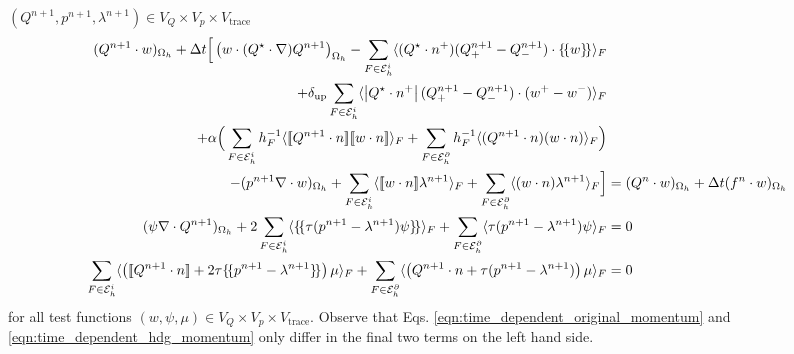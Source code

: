 \documentclass[11pt]{article}
\newcommand{\jump}[1]{[\![ #1]\!]}
\newcommand{\avg}[1]{\{\!\{#1\}\!\}}
\begin{document}
$(Q^{n+1},p^{n+1},\lambda^{n+1})\in V_Q\times V_p\times V_{\text{trace}}$
\begin{subequations}
    \begin{align}
        (Q^{n+1}\cdot w)_{\Omega_h} + \Delta t\Big[  \left(w\cdot (Q^\star\cdot \nabla) Q^{n+1}\right)_{\Omega_h}  -\sum_{F\in\mathcal{E}_h^i} \langle (Q^\star \cdot n^+)(Q^{n+1}_+ - Q^{n+1}_-)\cdot \avg{w}\rangle_F                              &
        \notag                                                                                                                                                                                                                                                                                                             \\
        +\delta_{\text{up}}\sum_{F\in\mathcal{E}_h^i} \langle \left|Q^\star \cdot n^+\right|(Q^{n+1}_+ - Q^{n+1}_-)\cdot (w^+-w^-)\rangle_F                                                                                                          & \label{eqn:time_dependent_hdg_momentum}                             \\
        + \alpha \Big(\sum_{F\in\mathcal{E}_h^i} h_F^{-1}\langle \jump{Q^{n+1}\cdot n} \jump{w\cdot n}\rangle_F                                      +  \sum_{F\in\mathcal{E}_h^\partial} h_F^{-1}\langle (Q^{n+1}\cdot n) (w\cdot n)\rangle_F \Big) & \notag                                                              \\
        - (p^{n+1} \nabla\cdot w)_{\Omega_h} +  \sum_{F\in\mathcal{E}_h^i} \langle \jump{w\cdot n}\lambda^{n+1}\rangle_{F}  +  \sum_{F\in\mathcal{E}_h^\partial} \langle (w\cdot n)\lambda^{n+1}\rangle_{F}     \Big]                                & = (Q^n\cdot w)_{\Omega_h} + \Delta t (f^n\cdot w)_{\Omega_h} \notag \\
        (\psi \nabla\cdot Q^{n+1})_{\Omega_h} + 2 \sum_{F\in\mathcal{E}_h^i} \langle \avg{\tau (p^{n+1}-\lambda^{n+1})\psi}\rangle_{F}            + \sum_{F\in\mathcal{E}_h^\partial} \langle \tau (p^{n+1}-\lambda^{n+1})\psi\rangle_{F}            & = 0  \label{eqn:time_dependent_hdg_continuity}                      \\
        \sum_{F\in\mathcal{E}_h^i} \langle \left(\jump{Q^{n+1}\cdot n}+2\tau \avg{p^{n+1}-\lambda^{n+1}}\right)\mu \rangle_{F} + \sum_{F\in\mathcal{E}_h^\partial} \langle \left(Q^{n+1}\cdot n+\tau (p^{n+1}-\lambda^{n+1})\right)\mu \rangle_{F}   & = 0\label{eqn:time_dependent_hdg_trace}
    \end{align}
\end{subequations}
for all test functions $(w,\psi,\mu) \in V_Q\times V_p\times V_{\text{trace}}$. Observe that Eqs. \eqref{eqn:time_dependent_original_momentum} and \eqref{eqn:time_dependent_hdg_momentum} only differ in the final two terms on the left hand side.
\end{document}
